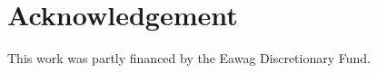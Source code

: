 \documentclass[11pt]{article}
\theoremstyle{definition}
\begin{document}
%




\section*{Acknowledgement}
This work was partly financed by the Eawag Discretionary Fund.




\end{document}
